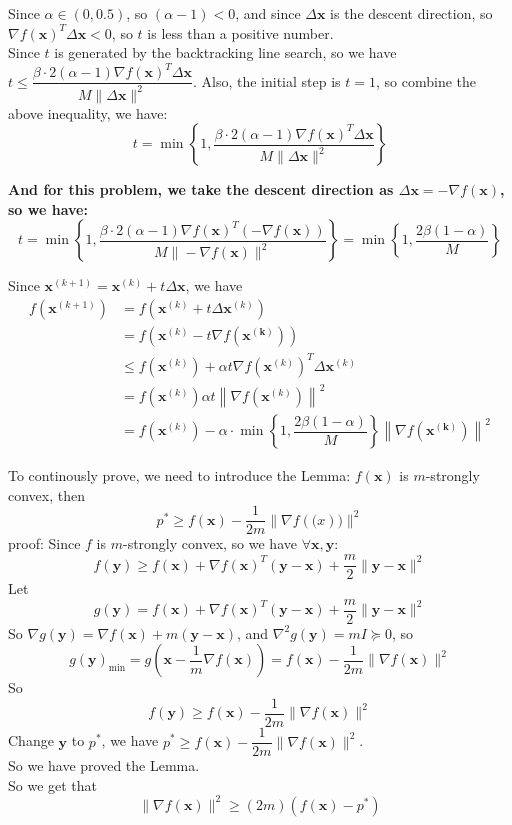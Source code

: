 Since $\alpha\in(0,0.5)$, so $(\alpha-1)<0$, and since $\Delta \mathbf{x}$ is the descent direction, so $\nabla f(\mathbf{x})^T\Delta \mathbf{x}<0$, so $t$ is less than a positive number.\\
Since $t$ is generated by the backtracking line search, so we have $t\leq \dfrac{\beta\cdot 2(\alpha-1)\nabla f(\mathbf{x})^T\Delta \mathbf{x}}{M\|\Delta \mathbf{x}\|^2}$.
Also, the initial step is $t=1$, so combine the above inequality, we have:
$$t=\min\left\{1,\dfrac{\beta\cdot 2(\alpha-1)\nabla f(\mathbf{x})^T\Delta \mathbf{x}}{M\|\Delta \mathbf{x}\|^2}\right\}$$

\textbf{And for this problem, we take the descent direction as $\Delta \mathbf{x}=-\nabla f(\mathbf{x})$, so we have:}
$$t=\min\left\{1,\dfrac{\beta\cdot 2(\alpha-1)\nabla f(\mathbf{x})^T(-\nabla f(\mathbf{x}))}{M\|-\nabla f(\mathbf{x})\|^2}\right\}=\min\left\{1,\dfrac{2\beta(1-\alpha)}{M}\right\}$$

Since $\mathbf{x}^{(k+1)}=\mathbf{x}^{(k)}+t\Delta\mathbf{x}$, we have 
\begin{align*}
    f\left(\mathbf{x}^{(k+1)}\right) &= f\left(\mathbf{x}^{(k)}+t\Delta\mathbf{x}^{(k)}\right) \\
    &= f\left(\mathbf{x}^{(k)}-t\nabla f\left(\mathbf{x^{(k)}}\right)\right) \\
    &\leq f\left(\mathbf{x}^{(k)}\right)+\alpha t\nabla f\left(\mathbf{x}^{(k)}\right)^T\Delta \mathbf{x}^{(k)} \\
    &= f\left(\mathbf{x}^{(k)}\right)\alpha t\left\|\nabla f\left(\mathbf{x}^{(k)}\right)\right\|^2 \\
    &= f\left(\mathbf{x}^{(k)}\right) - \alpha\cdot\min\left\{1,\dfrac{2\beta(1-\alpha)}{M}\right\} \left\|\nabla f\left(\mathbf{x^{(k)}}\right)\right\|^2
\end{align*}

To continously prove, we need to introduce the Lemma:
$f(\mathbf{x})$ is $m$-strongly convex, then $$p^*\geq f(\mathbf{x})-\dfrac{1}{2m}\|\nabla f(\mathbf(x))\|^2$$
proof:
Since $f$ is $m$-strongly convex, so we have $\forall \mathbf{x}, \mathbf{y}$:
$$f(\mathbf{y})\geq f(\mathbf{x})+\nabla f(\mathbf{x})^T(\mathbf{y}-\mathbf{x})+\dfrac{m}{2}\|\mathbf{y}-\mathbf{x}\|^2$$
Let $$g(\mathbf{y})= f(\mathbf{x})+\nabla f(\mathbf{x})^T(\mathbf{y}-\mathbf{x})+\dfrac{m}{2}\|\mathbf{y}-\mathbf{x}\|^2$$
So $\nabla g(\mathbf{y})=\nabla f(\mathbf{x}) + m(\mathbf{y}-\mathbf{x})$, and $\nabla^2g(\mathbf{y})=mI\succeq 0$, so 
$$g(\mathbf{y})_{\min}=g\left(\mathbf{x}-\dfrac{1}{m}\nabla f(\mathbf{x})\right)=f(\mathbf{x})-\dfrac{1}{2m}\|\nabla f(\mathbf{x})\|^2$$
So 
$$f(\mathbf{y})\geq f(\mathbf{x})-\dfrac{1}{2m}\|\nabla f(\mathbf{x})\|^2$$
Change $\mathbf{y}$ to $p^*$, we have $p^*\geq f(\mathbf{x})-\dfrac{1}{2m}\|\nabla f(\mathbf{x})\|^2$.\\
So we have proved the Lemma.\\
So we get that
$$\|\nabla f(\mathbf{x})\|^2\geq (2m)\left(f(\mathbf{x})-p^*\right)$$

